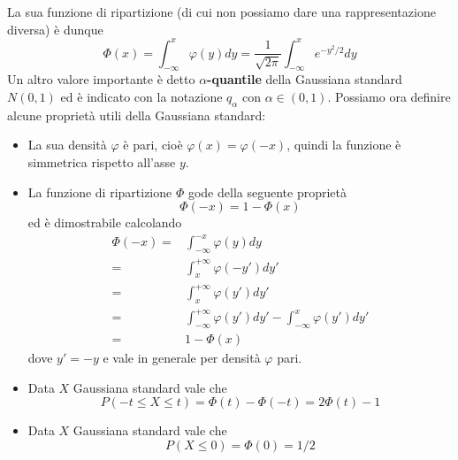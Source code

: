 \begin{center}
\end{center}
La sua funzione di ripartizione (di cui non possiamo dare una rappresentazione diversa) è dunque
\[
	\Phi(x) = \int_{-\infty}^x \varphi(y) dy =
	\frac{1}{\sqrt{2 \pi}} \int_{-\infty}^x e^{-y^2 / 2} dy
\]
Un altro valore importante è detto $\alpha$\textbf{-quantile} della Gaussiana standard $N(0,1)$ ed
è indicato con la notazione $q_\alpha$ con $\alpha \in (0,1)$. Possiamo ora definire alcune
proprietà utili della Gaussiana standard:
\begin{itemize}
	\item La sua densità $\varphi$ è pari, cioè $\varphi(x) = \varphi(-x)$, quindi la funzione è
	      simmetrica rispetto all'asse $y$.
	\item La funzione di ripartizione $\Phi$ gode della seguente proprietà
	      \[ \Phi(-x) = 1 - \Phi(x) \]
	      ed è dimostrabile calcolando
	      \begin{align*}
		      \Phi(-x) = & \int_{-\infty}^{-x} \varphi(y) dy           \\
		      =          & \int_x^{+\infty} \varphi(-y') dy'           \\
		      =          & \int_x^{+\infty} \varphi(y') dy'            \\
		      =          & \int_{-\infty}^{+\infty} \varphi (y') dy' -
		      \int_{-\infty}^x \varphi (y') dy'                        \\
		      =          & 1 - \Phi(x)
	      \end{align*}
	      dove $y' = -y$ e vale in generale per densità $\varphi$ pari.
	\item Data $X$ Gaussiana standard vale che
	      \[ P(-t \leq X \leq t) = \Phi (t) - \Phi (-t) = 2 \Phi (t) - 1 \]
	\item Data $X$ Gaussiana standard vale che
	      \[ P(X \leq 0) = \Phi (0) = 1 / 2 \]
\end{itemize}
